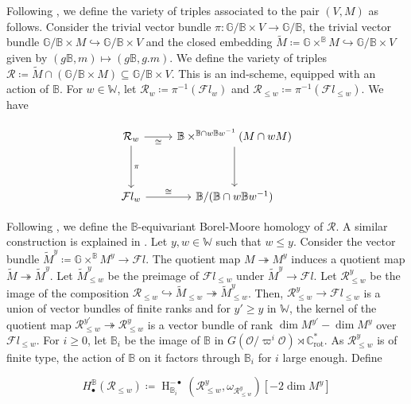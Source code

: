 \documentclass[11pt]{article}
\newcommand{\C}{\mathbb{C}}
\renewcommand{\O}{\mathcal{O}}
\newcommand{\R}{\mathcal{R}}
\newcommand{\bbG}{\mathbb{G}}
\newcommand{\bbB}{\mathbb{B}}
\newcommand{\1}{\mathbb{1}}
\newcommand{\tW}{\mathbb{W}}
\newcommand{\HBM}[2]{H_\bullet^{#1}(#2)}
\newcommand{\Crot}{\C^*_{\text{rot}}}
\newcommand{\tM}{\widetilde{M}}
\newcommand{\Fl}{\mathcal{F}l}
\renewcommand{\subset}{\subseteq}
\theoremstyle{definition}
\numberwithin{equation}{section}
\begin{document}
Following \cite{BFN}, we define the variety of triples associated to the pair $(V,M)$ as follows. Consider the trivial vector bundle $\pi:\bbG/\bbB \times V \rightarrow \bbG/\bbB$, the trivial vector bundle $\bbG/\bbB \times M \hookrightarrow \bbG/\bbB \times V$ and the closed embedding $\tM \coloneqq \bbG \times^\bbB M \hookrightarrow \bbG/\bbB \times V$ given by $(g\bbB,m)\mapsto (g\bbB,g.m)$. We define the variety of triples $\R \coloneqq \tM \cap (\bbG/\bbB \times M) \subset \bbG/\bbB \times V$. This is an ind-scheme, equipped with an action of $\bbB$. For $w\in \tW$, let $\R_w \coloneqq \pi^{-1}(\Fl_w)$ and $\R_{\leq w} \coloneqq \pi^{-1}(\Fl_{\leq w})$. We have

\begin{equation}
\label{affine_Rw_description}
\begin{tikzcd}
	\R_w & \bbB \times^{\bbB\cap w \bbB w^{-1}} (M \cap wM)\\
    \\
    \Fl_w & \bbB/(\bbB\cap w \bbB w^{-1})
	\arrow["\cong"', from=1-1, to=1-2]
	\arrow["\pi", from=1-1, to=3-1]
	\arrow[""', from=1-2, to=3-2]
	\arrow["\cong", from=3-1, to=3-2]
\end{tikzcd}  
\end{equation}

Following \cite[(ii)]{BFN}, we define the $\bbB$-equivariant Borel-Moore homology of $\R$. A similar construction is explained in \cite{GKO}. Let $y, w\in \tW$ such that $w \leq y$. Consider the vector bundle $\tM^y \coloneqq \bbG\times^\bbB M^y \rightarrow \Fl$. The quotient map $M \twoheadrightarrow M^y$ induces a quotient map $\tM \twoheadrightarrow \tM^y$. Let $\tM^y_{\leq w}$ be the preimage of $\Fl_{\leq w}$ under $\tM^y \rightarrow \Fl$. Let $\R^y_{\leq w}$ be the image of the composition $\R_{\leq w} \hookrightarrow \tM_{\leq w} \twoheadrightarrow \tM^y_{\leq w}$. Then, $\R^y_{\leq w} \rightarrow \Fl_{\leq w}$ is a union of vector bundles of finite ranks and for $y' \geq y$ in $\tW$, the kernel of the quotient map $\R^{y'}_{\leq w} \twoheadrightarrow \R^y_{\leq w}$ is a vector bundle of rank $\dim M^{y'} - \dim M^y$ over $\Fl_{\leq w}$. For $i\geq 0$, let $\bbB_i$ be the image of $\bbB$ in $G(\O/\varpi^i \O) \rtimes \Crot$. As $\R^y_{\leq w}$ is of finite type, the action of $\bbB$ on it factors through $\bbB_i$ for $i$ large enough. Define

\begin{equation}
\label{affine_def_H(R_leq_w)}
\HBM{\bbB}{\R_{\leq w}} \coloneqq \operatorname{H}^{-\bullet}_{\bbB_i} (\R^y_{\leq w}, \omega_{\R^y_{\leq w}})[-2 \dim M^y]    
\end{equation}
\end{document}
